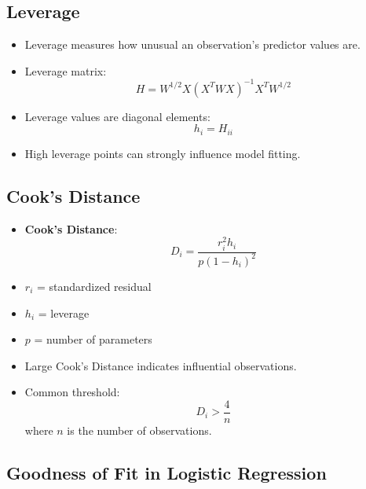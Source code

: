 \documentclass[10pt,a4paper]{article}
\begin{document}
	
	\subsection{Leverage}
	
	\begin{itemize}
	    \item Leverage measures how unusual an observation's predictor values are.
	    
	    \item Leverage matrix:
	    $$
	    H = W^{1/2}X(X^T W X)^{-1}X^T W^{1/2}
	    $$
	    
	    \item Leverage values are diagonal elements:
	    $$
	    h_i = H_{ii}
	    $$
	    
	    \item High leverage points can strongly influence model fitting.
	\end{itemize}
	
	
	
	\subsection{Cook's Distance}
	
	\begin{itemize}
	    \item \textbf{Cook's Distance}:
	    $$
	    D_i =
	    \frac{
	    r_i^2 h_i
	    }{
	    p(1-h_i)^2
	    }
	    $$
	    
	    \item $r_i$ = standardized residual
	    
	    \item $h_i$ = leverage
	    
	    \item $p$ = number of parameters
	    
	    \item Large Cook's Distance indicates influential observations.
	    
	    \item Common threshold:
	    $$
	    D_i > \frac{4}{n}
	    $$
	    where $n$ is the number of observations.
	\end{itemize}
	
	\subsection{Goodness of Fit in Logistic Regression}
	
\end{document}
